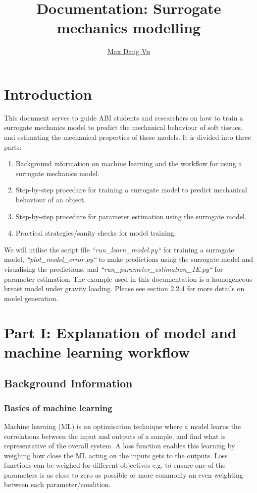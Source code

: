 \documentclass[11pt]{article}
\title{\textbf{Documentation: Surrogate mechanics modelling}}
\author{\href{mailto:mdan066@aucklanduni.ac.nz}{Max Dang Vu}}
\providecommand{\tightlist}{%
      \setlength{\itemsep}{0pt}\setlength{\parskip}{0pt}}
\begin{document}
\maketitle

\tableofcontents
\pagebreak

\section{Introduction}
This document serves to guide ABI students and researchers on how to train a surrogate mechanics model to predict the mechanical behaviour of soft tissues, and estimating the mechanical properties of these models. It is divided into three parts:
\begin{enumerate}
\tightlist
\item Background information on machine learning and the workflow for using a surrogate mechanics model. 
\item Step-by-step procedure for training a surrogate model to predict mechanical behaviour of an object. 
\item Step-by-step procedure for parameter estimation using the surrogate model.
\item Practical strategies/sanity checks for model training. 
\end{enumerate}

We will utilise the script file  \textit{``run\_learn\_model.py``} for training a surrogate model, \textit{``plot\_model\_error.py``} to make predictions using the surrogate model and visualising the predictions, and \textit{``run\_parameter\_estimation\_1E.py``} for parameter estimation. The example used in this documentation is a homogeneous breast model under gravity loading. Please see section 2.2.4 for more details on model generation. 

\section{Part I: Explanation of model and machine learning workflow}

\subsection{Background Information}

\subsubsection{Basics of machine learning}
Machine learning (ML) is an optimisation technique where a model learns the correlations between the input and outputs of a sample, and find what is representative of the overall system. A loss function enables this learning by weighing how close the ML acting on the inputs gets to the outputs. Loss functions can be weighed for different objectives e.g. to ensure one of the parameters is as close to zero as possible or more commonly an even weighting between each parameter/condition. 
\end{document}
